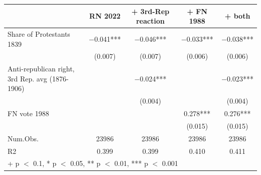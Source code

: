 \begin{table}
\centering
\begin{tabular}[t]{lcccc}
\toprule
  & RN 2022 & + 3rd-Rep reaction & + FN 1988 & + both\\
\midrule
Share of Protestants 1839 & \num{-0.041}*** & \num{-0.046}*** & \num{-0.033}*** & \num{-0.038}***\\
 & (\num{0.007}) & (\num{0.007}) & (\num{0.006}) & (\num{0.006})\\
Anti-republican right, 3rd Rep. avg (1876-1906) &  & \num{-0.024}*** &  & \num{-0.023}***\\
 &  & (\num{0.004}) &  & (\num{0.004})\\
FN vote 1988 &  &  & \num{0.278}*** & \num{0.276}***\\
 &  &  & (\num{0.015}) & (\num{0.015})\\
\midrule
Num.Obs. & \num{23986} & \num{23986} & \num{23986} & \num{23986}\\
R2 & \num{0.399} & \num{0.399} & \num{0.410} & \num{0.411}\\
\bottomrule
\multicolumn{5}{l}{\rule{0pt}{1em}+ p $<$ 0.1, * p $<$ 0.05, ** p $<$ 0.01, *** p $<$ 0.001}\\
\end{tabular}
\end{table}
